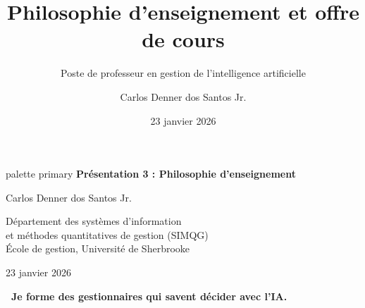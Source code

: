 \documentclass[aspectratio=169,11pt]{beamer}
\title[Philosophie d'enseignement]{Philosophie d'enseignement et offre de cours}
\subtitle{Poste de professeur en gestion de l'intelligence artificielle}
\author[C. D. dos Santos]{Carlos Denner dos Santos Jr.}
\institute[UdeS - SIMQG]{
  Département des systèmes d'information\\
  et méthodes quantitatives de gestion (SIMQG)\\
  École de gestion, Université de Sherbrooke
}
\date{23 janvier 2026}
\begin{document}
\begin{frame}
  \begin{beamercolorbox}[wd=\paperwidth,ht=2.5cm,dp=0.5cm,center]{palette primary}
    {\Large\bfseries Présentation 3 : Philosophie d'enseignement}
  \end{beamercolorbox}
  
  \vspace{0.8cm}
  
  \begin{center}
    {\Large Carlos Denner dos Santos Jr.}
    
    \vspace{0.8em}
    
    {\normalsize Département des systèmes d'information\\
    et méthodes quantitatives de gestion (SIMQG)\\
    École de gestion, Université de Sherbrooke}
    
    \vspace{0.8em}
    
    {\normalsize 23 janvier 2026}
    
    \vspace{1em}
    
    {\large\textcolor{ushervert}{\textbf{\guillemotleft~Je forme des gestionnaires qui savent décider avec l'IA.~\guillemotright}}}
  \end{center}
\end{frame}
\end{document}
